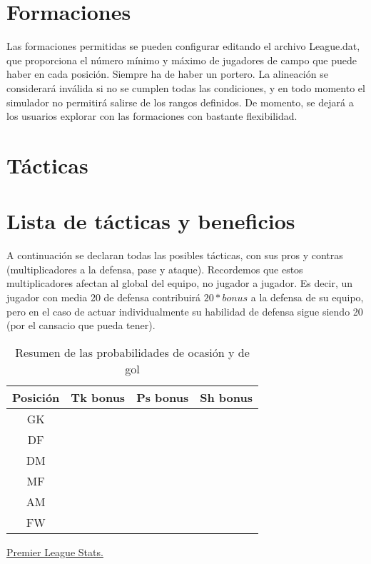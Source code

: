 \documentclass[a4paper,9pt]{article}
\begin{document}
\section{Formaciones}\label{sec:Formaciones}
Las formaciones permitidas se pueden configurar editando el archivo League.dat, que proporciona el número mínimo y máximo de jugadores de campo que puede haber en cada posición. Siempre ha de haber un portero. La alineación se considerará inválida si no se cumplen todas las condiciones, y en todo momento el simulador no permitirá salirse de los rangos definidos. De momento, se dejará a los usuarios explorar con las formaciones con bastante flexibilidad.

\section{Tácticas}\label{sec:Tacticas}
\section{Lista de tácticas y beneficios}\label{sec:Tacticas}
A continuación se declaran todas las posibles tácticas, con sus pros y contras (multiplicadores a la defensa, pase y ataque). Recordemos que estos multiplicadores afectan al global del equipo, no jugador a jugador. Es decir, un jugador con media 20 de defensa contribuirá $20*bonus$ a la defensa de su equipo, pero en el caso de actuar individualmente su habilidad de defensa sigue siendo 20 (por el cansacio que pueda tener).
\begin{table}
  \begin{center}
    \begin{tabular}{c c c c}
      \hline
      Posición & Tk bonus & Ps bonus & Sh bonus\\
      \hline
      GK & & & \\
      DF & & & \\
      DM & & & \\
      MF & & & \\
      AM & & & \\
      FW & & & \\
      \hline
    \end{tabular}
  \end{center}
  \caption{Resumen de las probabilidades de ocasión y de gol}
  \label{table:tacticbonus}
\end{table}

\newpage
\begin{thebibliography}{999}

  \href{https://www.whoscored.com/Regions/252/Tournaments/2/Seasons/7361/Stages/16368/TeamStatistics/England-Premier-League-2018-2019}{Premier League Stats.}
\end{thebibliography}
\end{document}
